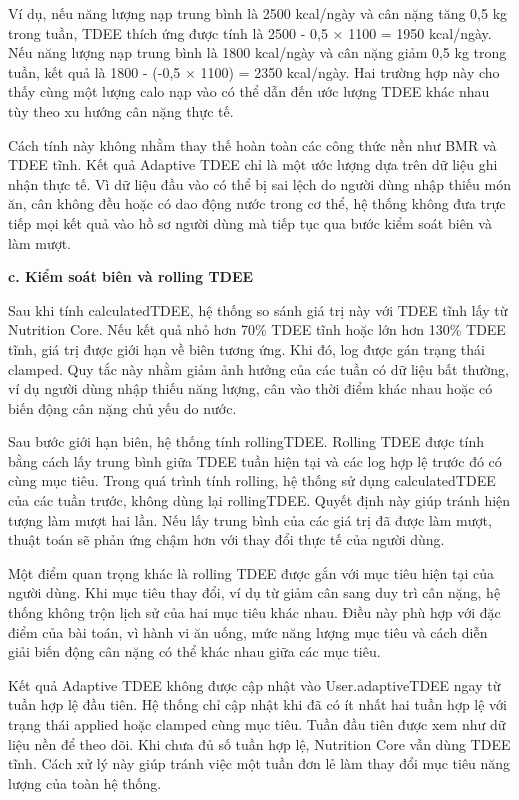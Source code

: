 \documentclass[12pt, a4paper]{report}
\begin{document}
Ví dụ, nếu năng lượng nạp trung bình là 2500 kcal/ngày và cân nặng tăng 0,5 kg trong tuần, TDEE thích ứng được tính là 2500 - 0,5 × 1100 = 1950 kcal/ngày. Nếu năng lượng nạp trung bình là 1800 kcal/ngày và cân nặng giảm 0,5 kg trong tuần, kết quả là 1800 - (-0,5 × 1100) = 2350 kcal/ngày. Hai trường hợp này cho thấy cùng một lượng calo nạp vào có thể dẫn đến ước lượng TDEE khác nhau tùy theo xu hướng cân nặng thực tế.

Cách tính này không nhằm thay thế hoàn toàn các công thức nền như BMR và TDEE tĩnh. Kết quả Adaptive TDEE chỉ là một ước lượng dựa trên dữ liệu ghi nhận thực tế. Vì dữ liệu đầu vào có thể bị sai lệch do người dùng nhập thiếu món ăn, cân không đều hoặc có dao động nước trong cơ thể, hệ thống không đưa trực tiếp mọi kết quả vào hồ sơ người dùng mà tiếp tục qua bước kiểm soát biên và làm mượt.

\textbf{c. Kiểm soát biên và rolling TDEE}

Sau khi tính calculatedTDEE, hệ thống so sánh giá trị này với TDEE tĩnh lấy từ Nutrition Core. Nếu kết quả nhỏ hơn 70\% TDEE tĩnh hoặc lớn hơn 130\% TDEE tĩnh, giá trị được giới hạn về biên tương ứng. Khi đó, log được gán trạng thái clamped. Quy tắc này nhằm giảm ảnh hưởng của các tuần có dữ liệu bất thường, ví dụ người dùng nhập thiếu năng lượng, cân vào thời điểm khác nhau hoặc có biến động cân nặng chủ yếu do nước.

Sau bước giới hạn biên, hệ thống tính rollingTDEE. Rolling TDEE được tính bằng cách lấy trung bình giữa TDEE tuần hiện tại và các log hợp lệ trước đó có cùng mục tiêu. Trong quá trình tính rolling, hệ thống sử dụng calculatedTDEE của các tuần trước, không dùng lại rollingTDEE. Quyết định này giúp tránh hiện tượng làm mượt hai lần. Nếu lấy trung bình của các giá trị đã được làm mượt, thuật toán sẽ phản ứng chậm hơn với thay đổi thực tế của người dùng.

Một điểm quan trọng khác là rolling TDEE được gắn với mục tiêu hiện tại của người dùng. Khi mục tiêu thay đổi, ví dụ từ giảm cân sang duy trì cân nặng, hệ thống không trộn lịch sử của hai mục tiêu khác nhau. Điều này phù hợp với đặc điểm của bài toán, vì hành vi ăn uống, mức năng lượng mục tiêu và cách diễn giải biến động cân nặng có thể khác nhau giữa các mục tiêu.

Kết quả Adaptive TDEE không được cập nhật vào User.adaptiveTDEE ngay từ tuần hợp lệ đầu tiên. Hệ thống chỉ cập nhật khi đã có ít nhất hai tuần hợp lệ với trạng thái applied hoặc clamped cùng mục tiêu. Tuần đầu tiên được xem như dữ liệu nền để theo dõi. Khi chưa đủ số tuần hợp lệ, Nutrition Core vẫn dùng TDEE tĩnh. Cách xử lý này giúp tránh việc một tuần đơn lẻ làm thay đổi mục tiêu năng lượng của toàn hệ thống.
\end{document}
